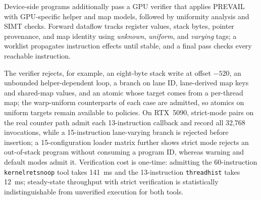 Device-side programs additionally pass a GPU verifier that applies PREVAIL~\cite{prevail-verifier} with GPU-specific helper and map models, followed by uniformity analysis and SIMT checks.
Forward dataflow tracks register values, stack bytes, pointer provenance, and map identity using \emph{unknown}, \emph{uniform}, and \emph{varying} tags; a worklist propagates instruction effects until stable, and a final pass checks every reachable instruction.

The verifier rejects, for example, an eight-byte stack write at offset $-520$, an unbounded helper-dependent loop, a branch on lane ID, lane-derived map keys and shared-map values, and an atomic whose target comes from a per-thread map; the warp-uniform counterparts of each case are admitted, so atomics on uniform targets remain available to policies.
On RTX~5090, strict-mode pairs on the real counter path admit each 13-instruction callback and record all 32{,}768 invocations, while a 15-instruction lane-varying branch is rejected before insertion; a 15-configuration loader matrix further shows strict mode rejects an out-of-stack program without consuming a program ID, whereas warning and default modes admit it.
Verification cost is one-time: admitting the 60-instruction \texttt{kernelretsnoop} tool takes 141~ms and the 13-instruction \texttt{threadhist} takes 12~ms; steady-state throughput with strict verification is statistically indistinguishable from unverified execution for both tools.

